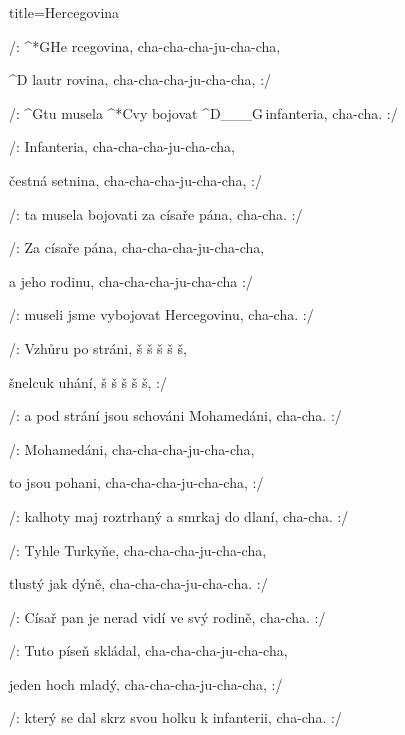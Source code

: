 \begin{song}{title=\predtitle\centering Hercegovina \\\large \vspace*{-0.3cm}}  %
\begin{centerjustified}
\nejnejvetsi

\sloka 
	/: ^*{G}He  rcegovina, cha-cha-cha-ju-cha-cha,
	
	^{D\,\,}lautr rovina, cha-cha-cha-ju-cha-cha, :/
	
	/: ^{G}tu musela ^*{C}vy bojovat ^{D{\color{white}\_\_\_}G\,}infanteria, cha-cha. :/
	
\sloka
	/: Infanteria, cha-cha-cha-ju-cha-cha,
	
	čestná setnina, cha-cha-cha-ju-cha-cha, :/
	
	/: ta musela bojovati za císaře pána, cha-cha. :/
	
\sloka
	/: Za císaře pána, cha-cha-cha-ju-cha-cha,
	
	a jeho rodinu, cha-cha-cha-ju-cha-cha :/
	
	/: museli jsme vybojovat Hercegovinu, cha-cha. :/
	
\sloka
	/: Vzhůru po stráni, š š š š š,
	
	šnelcuk uhání, š š š š š, :/
	
	/: a pod strání jsou schováni Mohamedáni, cha-cha. :/
	
\sloka
	/: Mohamedáni, cha-cha-cha-ju-cha-cha,
	
	to jsou pohani, cha-cha-cha-ju-cha-cha, :/
	
	/: kalhoty maj roztrhaný a smrkaj do dlaní, cha-cha. :/
	
\sloka
	/: Tyhle Turkyňe, cha-cha-cha-ju-cha-cha,
	
	tlustý jak dýně, cha-cha-cha-ju-cha-cha. :/
	
	/: Císař pan je nerad vidí ve svý rodině, cha-cha. :/
	
\sloka
	/: Tuto píseň skládal, cha-cha-cha-ju-cha-cha,
	
	jeden hoch mladý, cha-cha-cha-ju-cha-cha, :/
	
	/: který se dal skrz svou holku k infanterii, cha-cha. :/
	

\end{centerjustified}
\setcounter{Slokočet}{0}
\end{song}
